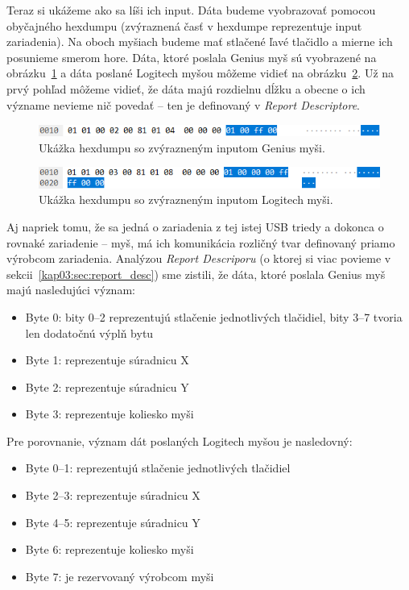 Teraz si ukážeme ako sa líši ich input. Dáta budeme vyobrazovať pomocou obyčajného hexdumpu (zvýraznená časť v hexdumpe reprezentuje input zariadenia). Na oboch myšiach budeme mať stlačené ľavé tlačidlo a mierne ich posunieme smerom hore. Dáta, ktoré poslala Genius myš sú vyobrazené na obrázku~\ref{obr:uvod:genius:input} a dáta poslané Logitech myšou môžeme vidieť na obrázku~\ref{obr:uvod:logitech:input}. Už na prvý pohľad môžeme vidieť, že dáta majú rozdielnu dĺžku a obecne o ich význame nevieme nič povedať -- ten je definovaný v \textit{Report Descriptore}.

\begin{figure}[!htb]
	\centering
	\includegraphics[width=12cm]{img/uvod_genius_input}
	\caption{Ukážka hexdumpu so zvýrazneným inputom Genius myši.}
	\label{obr:uvod:genius:input}
\end{figure}

\begin{figure}[!htb]
	\centering
	\includegraphics[width=12cm]{img/uvod_logitech_input}
	\caption{Ukážka hexdumpu so zvýrazneným inputom Logitech myši.}
	\label{obr:uvod:logitech:input}
\end{figure}

Aj napriek tomu, že sa jedná o zariadenia z tej istej USB triedy a dokonca o rovnaké zariadenie -- myš,  má ich komunikácia rozličný tvar definovaný priamo výrobcom zariadenia. Analýzou \textit{Report Descriporu} (o ktorej si viac povieme v sekcii~\ref{kap03:sec:report_desc}) sme zistili, že dáta, ktoré poslala Genius myš majú nasledujúci význam:
\begin{itemize}
\item Byte 0: bity 0--2 reprezentujú stlačenie jednotlivých tlačidiel, bity 3--7 tvoria len dodatočnú výplň bytu
\item Byte 1: reprezentuje súradnicu X
\item Byte 2: reprezentuje súradnicu Y
\item Byte 3: reprezentuje koliesko myši
\end{itemize}

Pre porovnanie, význam dát poslaných Logitech myšou je nasledovný:
\begin{itemize}
\item Byte 0--1: reprezentujú stlačenie jednotlivých tlačidiel
\item Byte 2--3: reprezentuje súradnicu X
\item Byte 4--5: reprezentuje súradnicu Y
\item Byte 6: reprezentuje koliesko myši
\item Byte 7: je rezervovaný výrobcom myši
\end{itemize}

